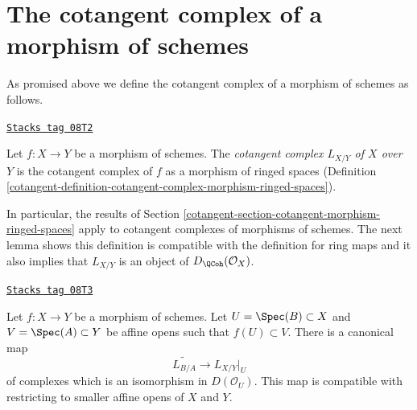 \section{The cotangent complex of a morphism of schemes}
\label{cotangent-section-cotangent-morphism-schemes}
As promised above we define the cotangent complex of a morphism of
schemes as follows.

\begin{definition}
\label{cotangent-definition-cotangent-morphism-schemes}
\href{https://stacks.math.columbia.edu/tag/08T2}{\texttt{Stacks tag 08T2}}

Let $f : X \to Y$ be a morphism of schemes. The {\it cotangent complex
$L_{X/Y}$ of $X$ over $Y$} is the cotangent complex of $f$ as a
morphism of ringed spaces
(Definition \ref{cotangent-definition-cotangent-complex-morphism-ringed-spaces}).
\end{definition}

In particular, the results of
Section \ref{cotangent-section-cotangent-morphism-ringed-spaces} apply
to cotangent complexes of morphisms of schemes.
The next lemma shows this definition is compatible with the definition
for ring maps and it also implies that $L_{X/Y}$ is an
object of $D_\QCoh(\mathcal{O}_X)$.

\begin{lemma}
\label{cotangent-lemma-morphism-affine-schemes}
\href{https://stacks.math.columbia.edu/tag/08T3}{\texttt{Stacks tag 08T3}}

Let $f : X \to Y$ be a morphism of schemes. Let $U = \Spec(B) \subset X$
and $V = \Spec(A) \subset Y$ be affine opens such that $f(U) \subset V$.
There is a canonical map
$$
\widetilde{L_{B/A}} \longrightarrow L_{X/Y}|_U
$$
of complexes which is an isomorphism in $D(\mathcal{O}_U)$.
This map is compatible with restricting to smaller affine opens
of $X$ and $Y$.
\end{lemma}

